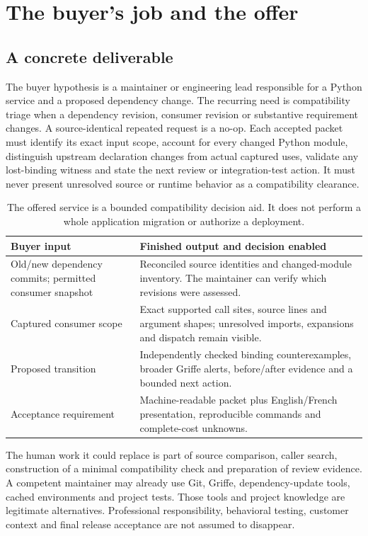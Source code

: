 \documentclass[11pt,letterpaper]{article}
\begin{document}
\section{The buyer's job and the offer}
\subsection{A concrete deliverable}
The buyer hypothesis is a maintainer or engineering lead responsible for a Python service and a proposed dependency change. The recurring need is compatibility triage when a dependency revision, consumer revision or substantive requirement changes. A source-identical repeated request is a no-op. Each accepted packet must identify its exact input scope, account for every changed Python module, distinguish upstream declaration changes from actual captured uses, validate any lost-binding witness and state the next review or integration-test action. It must never present unresolved source or runtime behavior as a compatibility clearance.

\begin{table}[H]\small
\begin{tabularx}{\textwidth}{@{}p{1.35in}Y@{}}\toprule
Buyer input & Finished output and decision enabled\\\midrule
Old/new dependency commits; permitted consumer snapshot & Reconciled source identities and changed-module inventory. The maintainer can verify which revisions were assessed.\\
Captured consumer scope & Exact supported call sites, source lines and argument shapes; unresolved imports, expansions and dispatch remain visible.\\
Proposed transition & Independently checked binding counterexamples, broader Griffe alerts, before/after evidence and a bounded next action.\\
Acceptance requirement & Machine-readable packet plus English/French presentation, reproducible commands and complete-cost unknowns.\\\bottomrule
\end{tabularx}
\caption{The offered service is a bounded compatibility decision aid. It does not perform a whole application migration or authorize a deployment.}
\end{table}

The human work it could replace is part of source comparison, caller search, construction of a minimal compatibility check and preparation of review evidence. A competent maintainer may already use Git, Griffe, dependency-update tools, cached environments and project tests. Those tools and project knowledge are legitimate alternatives. Professional responsibility, behavioral testing, customer context and final release acceptance are not assumed to disappear.
\end{document}

